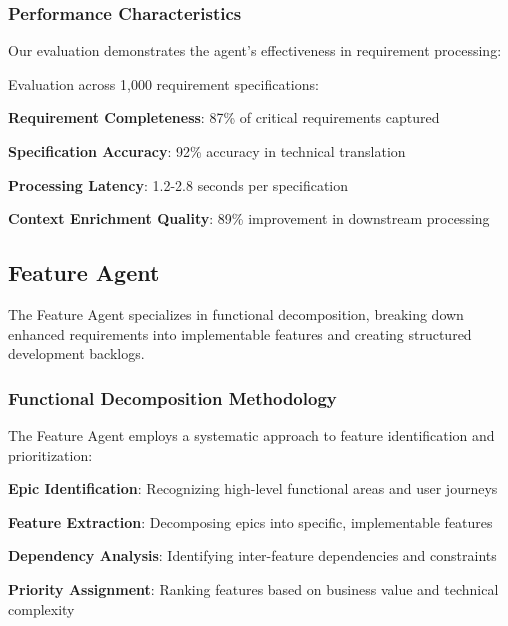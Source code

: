 \subsubsection*{Performance Characteristics}

Our evaluation demonstrates the agent's effectiveness in requirement processing:

\begin{infobox}[title=Enhancer-Prompt Agent Performance]
Evaluation across 1,000 requirement specifications:
\begin{compactlist}
    \item \textbf{Requirement Completeness}: 87\% of critical requirements captured
    \item \textbf{Specification Accuracy}: 92\% accuracy in technical translation
    \item \textbf{Processing Latency}: 1.2-2.8 seconds per specification
    \item \textbf{Context Enrichment Quality}: 89\% improvement in downstream processing
\end{compactlist}
\end{infobox}

\subsection*{Feature Agent}

The Feature Agent specializes in functional decomposition, breaking down enhanced requirements into implementable features and creating structured development backlogs.

\subsubsection*{Functional Decomposition Methodology}

The Feature Agent employs a systematic approach to feature identification and prioritization:

\begin{expandedlist}
    \item \textbf{Epic Identification}: Recognizing high-level functional areas and user journeys
    \item \textbf{Feature Extraction}: Decomposing epics into specific, implementable features
    \item \textbf{Dependency Analysis}: Identifying inter-feature dependencies and constraints
    \item \textbf{Priority Assignment}: Ranking features based on business value and technical complexity
\end{expandedlist}

